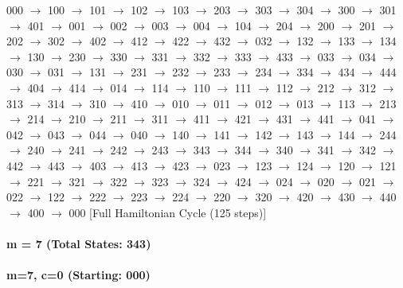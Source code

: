 000 $\rightarrow$ 100 $\rightarrow$ 101 $\rightarrow$ 102 $\rightarrow$ 103 $\rightarrow$ 203 $\rightarrow$ 303 $\rightarrow$ 304 $\rightarrow$ 300 $\rightarrow$ 301 $\rightarrow$ 401 $\rightarrow$ 001 $\rightarrow$ 002 $\rightarrow$ 003 $\rightarrow$ 004 $\rightarrow$ 104 $\rightarrow$ 204 $\rightarrow$ 200 $\rightarrow$ 201 $\rightarrow$ 202 $\rightarrow$ 302 $\rightarrow$ 402 $\rightarrow$ 412 $\rightarrow$ 422 $\rightarrow$ 432 $\rightarrow$ 032 $\rightarrow$ 132 $\rightarrow$ 133 $\rightarrow$ 134 $\rightarrow$ 130 $\rightarrow$ 230 $\rightarrow$ 330 $\rightarrow$ 331 $\rightarrow$ 332 $\rightarrow$ 333 $\rightarrow$ 433 $\rightarrow$ 033 $\rightarrow$ 034 $\rightarrow$ 030 $\rightarrow$ 031 $\rightarrow$ 131 $\rightarrow$ 231 $\rightarrow$ 232 $\rightarrow$ 233 $\rightarrow$ 234 $\rightarrow$ 334 $\rightarrow$ 434 $\rightarrow$ 444 $\rightarrow$ 404 $\rightarrow$ 414 $\rightarrow$ 014 $\rightarrow$ 114 $\rightarrow$ 110 $\rightarrow$ 111 $\rightarrow$ 112 $\rightarrow$ 212 $\rightarrow$ 312 $\rightarrow$ 313 $\rightarrow$ 314 $\rightarrow$ 310 $\rightarrow$ 410 $\rightarrow$ 010 $\rightarrow$ 011 $\rightarrow$ 012 $\rightarrow$ 013 $\rightarrow$ 113 $\rightarrow$ 213 $\rightarrow$ 214 $\rightarrow$ 210 $\rightarrow$ 211 $\rightarrow$ 311 $\rightarrow$ 411 $\rightarrow$ 421 $\rightarrow$ 431 $\rightarrow$ 441 $\rightarrow$ 041 $\rightarrow$ 042 $\rightarrow$ 043 $\rightarrow$ 044 $\rightarrow$ 040 $\rightarrow$ 140 $\rightarrow$ 141 $\rightarrow$ 142 $\rightarrow$ 143 $\rightarrow$ 144 $\rightarrow$ 244 $\rightarrow$ 240 $\rightarrow$ 241 $\rightarrow$ 242 $\rightarrow$ 243 $\rightarrow$ 343 $\rightarrow$ 344 $\rightarrow$ 340 $\rightarrow$ 341 $\rightarrow$ 342 $\rightarrow$ 442 $\rightarrow$ 443 $\rightarrow$ 403 $\rightarrow$ 413 $\rightarrow$ 423 $\rightarrow$ 023 $\rightarrow$ 123 $\rightarrow$ 124 $\rightarrow$ 120 $\rightarrow$ 121 $\rightarrow$ 221 $\rightarrow$ 321 $\rightarrow$ 322 $\rightarrow$ 323 $\rightarrow$ 324 $\rightarrow$ 424 $\rightarrow$ 024 $\rightarrow$ 020 $\rightarrow$ 021 $\rightarrow$ 022 $\rightarrow$ 122 $\rightarrow$ 222 $\rightarrow$ 223 $\rightarrow$ 224 $\rightarrow$ 220 $\rightarrow$ 320 $\rightarrow$ 420 $\rightarrow$ 430 $\rightarrow$ 440 $\rightarrow$ 400 $\rightarrow$ 000 [Full Hamiltonian Cycle (125 steps)]

\paragraph{ m = 7 (Total States: 343)}


\paragraph{m=7, c=0 (Starting: 000)}



